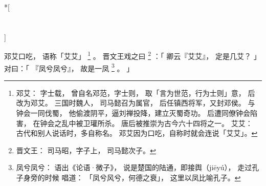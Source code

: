 
\switchcolumn[0]*[\section{}]

邓艾口吃，
语称「艾艾」%
\footnote{%
    邓艾：
        字士载，
        曾自名邓范，字士则，
        取「言为世范，行为士则」意，
        后改为邓艾。
        三国时魏人，
        司马懿召为属官，
        后任镇西将军，又封邓侯。
        与钟会一同伐蜀，
        他偷渡阴平，逼刘禅投降，建立灭蜀奇功。
        后遭同僚钟会陷害，
        在钟会之乱中被卫瓘所杀。
        唐后被推崇为古今六十四将之一。
    艾艾：
        古代和别人说话时，多自称名。
        邓艾因为口吃，自称时就会连说「艾艾」。
}%
。
晋文王戏之曰%
\footnote{%
    晋文王：
        司马昭，字子上，
        司马懿次子。
}%
：「
    卿云『艾艾』，
    定是几艾？
」
对曰：「
    『凤兮凤兮』，
    故是一凤%
    \footnote{%
        凤兮凤兮：
            语出《论语·微子》，
            说是楚国的陆通，即接舆（jiēyú），
            走过孔子身旁的时候
            唱道：
            「凤兮风兮，何德之衰」，
            这里以凤比喻孔子。
    }%
    。
」

\switchcolumn



